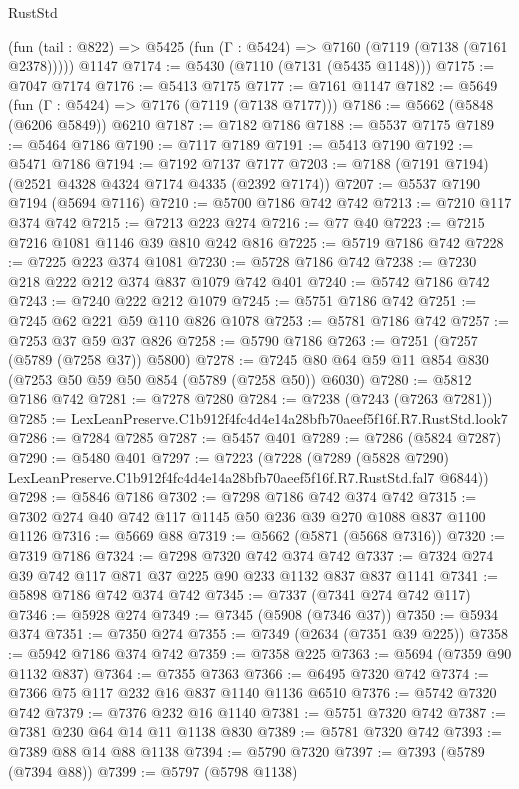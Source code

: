 \begin{lexlean}{RustStd}
\begin{coremodule}
    (fun (tail : @822) => @5425 (fun (Γ : @5424) => @7160 (@7119 (@7138 (@7161 @2378)))))
    @1147
@7174 := @5430 (@7110 (@7131 (@5435 @1148)))
@7175 := @7047 @7174
@7176 := @5413 @7175
@7177 := @7161 @1147
@7182 := @5649 (fun (Γ : @5424) => @7176 (@7119 (@7138 @7177)))
@7186 := @5662 (@5848 (@6206 @5849)) @6210
@7187 := @7182 @7186
@7188 := @5537 @7175
@7189 := @5464 @7186
@7190 := @7117 @7189
@7191 := @5413 @7190
@7192 := @5471 @7186
@7194 := @7192 @7137 @7177
@7203 := @7188 (@7191 @7194) (@2521 @4328 @4324 @7174 @4335 (@2392 @7174))
@7207 := @5537 @7190 @7194 (@5694 @7116)
@7210 := @5700 @7186 @742 @742
@7213 := @7210 @117 @374 @742
@7215 := @7213 @223 @274
@7216 := @77 @40
@7223 := @7215 @7216 @1081 @1146 @39 @810 @242 @816
@7225 := @5719 @7186 @742
@7228 := @7225 @223 @374 @1081
@7230 := @5728 @7186 @742
@7238 := @7230 @218 @222 @212 @374 @837 @1079 @742 @401
@7240 := @5742 @7186 @742
@7243 := @7240 @222 @212 @1079
@7245 := @5751 @7186 @742
@7251 := @7245 @62 @221 @59 @110 @826 @1078
@7253 := @5781 @7186 @742
@7257 := @7253 @37 @59 @37 @826
@7258 := @5790 @7186
@7263 := @7251 (@7257 (@5789 (@7258 @37)) @5800)
@7278 := @7245 @80 @64 @59 @11 @854 @830 (@7253 @50 @59 @50 @854 (@5789 (@7258 @50)) @6030)
@7280 := @5812 @7186 @742
@7281 := @7278 @7280
@7284 := @7238 (@7243 (@7263 @7281))
@7285 := LexLeanPreserve.C1b912f4fc4d4e14a28bfb70aeef5f16f.R7.RustStd.look7
@7286 := @7284 @7285
@7287 := @5457 @401
@7289 := @7286 (@5824 @7287)
@7290 := @5480 @401
@7297 := @7223
    (@7228
      (@7289 (@5828 @7290) LexLeanPreserve.C1b912f4fc4d4e14a28bfb70aeef5f16f.R7.RustStd.fal7 @6844))
@7298 := @5846 @7186
@7302 := @7298 @7186 @742 @374 @742
@7315 := @7302 @274 @40 @742 @117 @1145 @50 @236 @39 @270 @1088 @837 @1100 @1126
@7316 := @5669 @88
@7319 := @5662 (@5871 (@5668 @7316))
@7320 := @7319 @7186
@7324 := @7298 @7320 @742 @374 @742
@7337 := @7324 @274 @39 @742 @117 @871 @37 @225 @90 @233 @1132 @837 @837 @1141
@7341 := @5898 @7186 @742 @374 @742
@7345 := @7337 (@7341 @274 @742 @117)
@7346 := @5928 @274
@7349 := @7345 (@5908 (@7346 @37))
@7350 := @5934 @374
@7351 := @7350 @274
@7355 := @7349 (@2634 (@7351 @39 @225))
@7358 := @5942 @7186 @374 @742
@7359 := @7358 @225
@7363 := @5694 (@7359 @90 @1132 @837)
@7364 := @7355 @7363
@7366 := @6495 @7320 @742
@7374 := @7366 @75 @117 @232 @16 @837 @1140 @1136 @6510
@7376 := @5742 @7320 @742
@7379 := @7376 @232 @16 @1140
@7381 := @5751 @7320 @742
@7387 := @7381 @230 @64 @14 @11 @1138 @830
@7389 := @5781 @7320 @742
@7393 := @7389 @88 @14 @88 @1138
@7394 := @5790 @7320
@7397 := @7393 (@5789 (@7394 @88))
@7399 := @5797 (@5798 @1138)

\end{coremodule}
\end{lexlean}
